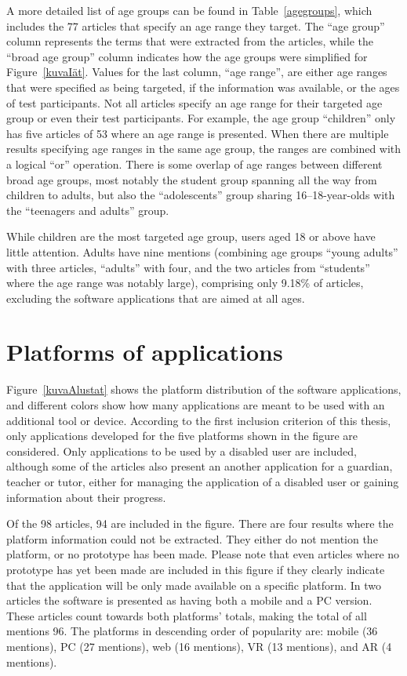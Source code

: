\documentclass[utf8,english]{gradu3}
\begin{document}
A more detailed list of age groups can be found in Table~\ref{agegroups},
which includes the 77 articles that specify an age range they target.
The ``age group'' column represents the terms that were extracted from the articles,
while the ``broad age group'' column indicates how the age groups were simplified for Figure~\ref{kuvaIät}.
Values for the last column, ``age range'', are either age ranges that were specified as being targeted,
if the information was available, or the ages of test participants.
Not all articles specify an age range for their targeted age group or even their test participants.
For example, the age group ``children'' only has five articles of 53 where an age range is presented.
When there are multiple results specifying age ranges in the same age group,
the ranges are combined with a logical ``or'' operation.
There is some overlap of age ranges between different broad age groups,
most notably the student group spanning all the way from children to adults,
but also the ``adolescents'' group sharing 16--18-year-olds with the ``teenagers and adults'' group.

While children are the most targeted age group, users aged 18 or above have little attention.
Adults have nine mentions (combining age groups ``young adults'' with three articles, ``adults'' with four,
and the two articles from ``students'' where the age range was notably large), comprising only 9.18\%
of articles, excluding the software applications that are aimed at all ages.


\section{Platforms of applications} %

Figure~\ref{kuvaAlustat} shows the platform distribution of the software applications,
and different colors show how many applications are meant to be used with an additional tool or device.
According to the first inclusion criterion of this thesis, only applications developed for
the five platforms shown in the figure are considered.
Only applications to be used by a disabled user are included, although some of
the articles also present an another application for a guardian, teacher or tutor, either for managing
the application of a disabled user or gaining information about their progress.

Of the 98 articles, 94 are included in the figure.
There are four results where the platform information could not be extracted.
They either do not mention the platform, or no prototype has been made.
Please note that even articles where no prototype has yet been made are included in this figure
if they clearly indicate that the application will be only made available on a specific platform.
In two articles the software is presented as having both a mobile and a PC version.
These articles count towards both platforms' totals, making the total of all mentions 96.
The platforms in descending order of popularity are:
mobile (36 mentions), PC (27 mentions), web (16 mentions), VR (13 mentions), and AR (4 mentions).
\end{document}
